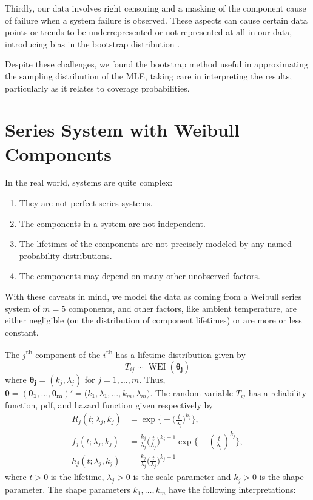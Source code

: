 \documentclass[
]{article}
\begin{document}
Thirdly, our data involves right censoring and a masking of the
component cause of failure when a system failure is observed. These
aspects can cause certain data points or trends to be underrepresented
or not represented at all in our data, introducing bias in the bootstrap
distribution \citep{klein2005survival}.

Despite these challenges, we found the bootstrap method useful in
approximating the sampling distribution of the MLE, taking care in
interpreting the results, particularly as it relates to coverage
probabilities.

\hypertarget{sec:weibull}{%
\section{Series System with Weibull Components}\label{sec:weibull}}

In the real world, systems are quite complex:

\begin{enumerate}
\def\labelenumi{\arabic{enumi}.}
\item
  They are not perfect series systems.
\item
  The components in a system are not independent.
\item
  The lifetimes of the components are not precisely modeled by any named
  probability distributions.
\item
  The components may depend on many other unobserved factors.
\end{enumerate}

With these caveats in mind, we model the data as coming from a Weibull
series system of \(m = 5\) components, and other factors, like ambient
temperature, are either negligible (on the distribution of component
lifetimes) or are more or less constant.

The \(j\)\textsuperscript{th} component of the \(i\)\textsuperscript{th}
has a lifetime distribution given by \[
    T_{i j} \sim \operatorname{WEI}(\boldsymbol{\theta_j})
\] where \(\boldsymbol{\theta_j} = (k_j, \lambda_j)\) for
\(j=1,\ldots,m\). Thus,
\(\boldsymbol{\theta }= (\boldsymbol{\theta_1},\ldots,\boldsymbol{\theta_m})' = \bigl(k_1,\lambda_1,\ldots,k_m,\lambda_m\bigr)\).
The random variable \(T_{i j}\) has a reliability function, pdf, and
hazard function given respectively by \begin{align}
    R_j(t;\lambda_j,k_j)
        &= \exp\biggl\{-\biggl(\frac{t}{\lambda_j}\biggr)^{k_j}\biggr\},\\
    f_j(t;\lambda_j,k_j)
        &= \frac{k_j}{\lambda_j}\biggl(\frac{t}{\lambda_j}\biggr)^{k_j-1}
        \exp\biggl\{-\left(\frac{t}{\lambda_j}\right)^{k_j} \biggr\},\\
    h_j(t;\lambda_j,k_j) \label{eq:weibull_haz}
        &= \frac{k_j}{\lambda_j}\biggl(\frac{t}{\lambda_j}\biggr)^{k_j-1}
\end{align} where \(t > 0\) is the lifetime, \(\lambda_j > 0\) is the
scale parameter and \(k_j > 0\) is the shape parameter. The shape
parameters \(k_1, \ldots, k_m\) have the following interpretations:
\end{document}
